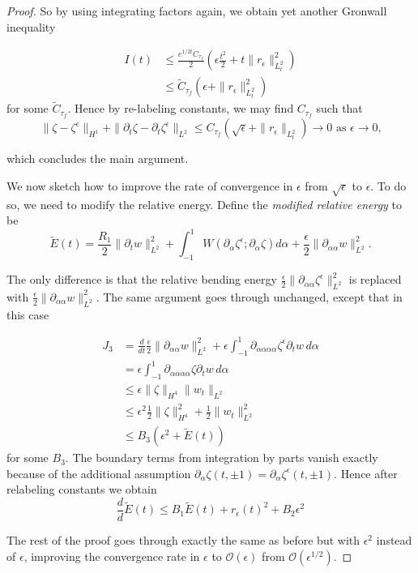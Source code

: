 \documentclass{article}[12pt]
\theoremstyle{Theorem}
\begin{document}
\begin{proof}
So by using integrating factors again, we obtain yet another Gronwall inequality

\begin{align}
    I(t) &\leq \frac{e^{1/2t} C_{\tau_f}}{2}(\epsilon \frac{t^2}{2} + t \|r_\epsilon\|^2_{L^2_t}) \\ 
    &\leq \tilde{C}_{\tau_f}(\epsilon  + \|r_\epsilon\|^2_{L^2_t})
\end{align}
for some $\tilde{C}_{\tau_f}$. Hence by re-labeling constants, we may find $C_{\tau_f}$ such that
\begin{equation}
    \|\zeta - \zeta^\epsilon\|_{H^1} + \|\partial_t\zeta - \partial_t\zeta^\epsilon\|_{L^2} \leq C_{\tau_f}(\sqrt{\epsilon} +\|r_\epsilon\|_{L^2_t}) \rightarrow 0 \text{ as $\epsilon \rightarrow 0$,}
\end{equation}

which concludes the main argument.
\newline

We now sketch how to improve the rate of convergence in $\epsilon$ from $\sqrt{\epsilon}$ to $\epsilon$. To do so, we need to modify the relative energy. Define the \textit{modified relative energy} to be 
\begin{equation}
           \tilde{E}(t) = \frac{R_1}{2}\|\partial_tw\|^2_{L^2}
            +\int_{-1}^1W(\partial_\alpha\zeta^\epsilon;\partial_\alpha\zeta)d\alpha
            + \frac{\epsilon}{2}\|\partial_{\alpha\alpha}w\|^2_{L^2}.
\end{equation}

The only difference is that the relative bending energy  $\frac{\epsilon}{2}\|\partial_{\alpha\alpha}\zeta^\epsilon\|^2_{L^2}$ is replaced with $\frac{\epsilon}{2}\|\partial_{\alpha\alpha}w\|^2_{L^2}.$ The same argument goes through unchanged, except that in this case 

\begin{align}
    J_3 &= \frac{d}{dt}\frac{\epsilon}{2}\|\partial_{\alpha\alpha}w\|^2_{L^2}  + \epsilon\int_{-1}^1
\partial_{\alpha\alpha\alpha\alpha}\zeta^\epsilon\partial_{t}w\,d\alpha \\
&=\epsilon\int_{-1}^1 \partial_{\alpha\alpha\alpha\alpha}\zeta\partial_{t}w \,d\alpha \\
&\leq \epsilon\|\zeta\|_{H^4}\|w_t\|_{L^2} \\ 
&\leq\epsilon^2 \frac{1}{2}\|\zeta\|^2_{H^4} + \frac{1}{2}\|w_t\|^2_{L^2} \\
&\leq B_3(\epsilon^2 + \tilde{E}(t))
\end{align}
for some $B_3$. The boundary terms from integration by parts vanish exactly because of the additional assumption $\partial_\alpha \zeta(t,\pm1) = \partial_\alpha \zeta^\epsilon(t,\pm1)$. Hence after relabeling constants we obtain 
\begin{equation}
    \frac{d}{d}\tilde{E}(t) \leq B_1 \tilde{E}(t) + r_\epsilon(t)^2 + B_2\epsilon^2
\end{equation}

 The rest of the proof goes through exactly the same as before but with $\epsilon^2$ instead of $\epsilon$, improving the convergence rate in $\epsilon$ to $\mathcal{O}(\epsilon)$ from $\mathcal{O}(\epsilon^{1/2})$.
 \end{proof}
\end{document}
